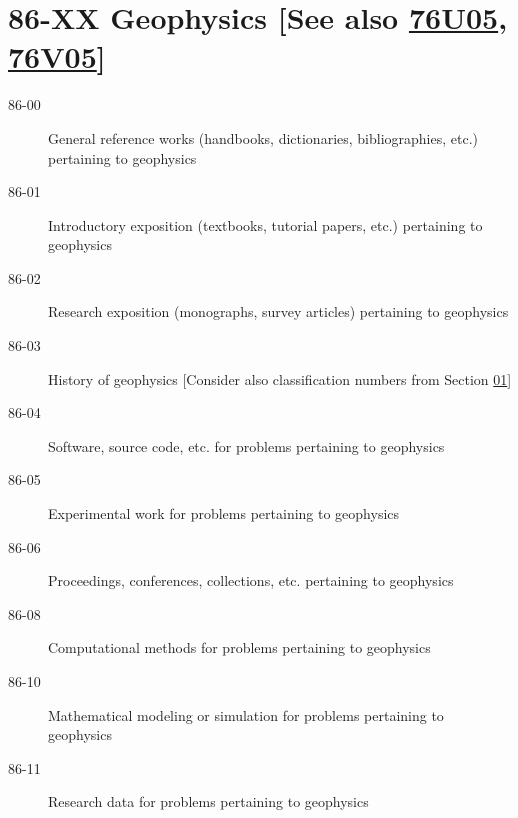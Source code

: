 \section*{86-XX Geophysics [See also \hyperref[76U05]{76U05}, \hyperref[76V05]{76V05}] }\label{86-XX}
\begin{description}
\item [86-00]\label{86-00} General reference works (handbooks, dictionaries, bibliographies, etc.) pertaining to geophysics
\item [86-01]\label{86-01} Introductory exposition (textbooks, tutorial papers, etc.) pertaining to geophysics
\item [86-02]\label{86-02} Research exposition (monographs, survey articles) pertaining to geophysics
\item [86-03]\label{86-03} History of geophysics [Consider also classification numbers from Section \hyperref[01-XX]{01}]
\item [86-04]\label{86-04} Software, source code, etc. for problems pertaining to geophysics
\item [86-05]\label{86-05} Experimental work for problems pertaining to geophysics
\item [86-06]\label{86-06} Proceedings, conferences, collections, etc. pertaining to geophysics
\item [86-08]\label{86-08} Computational methods for problems pertaining to geophysics
\item [86-10]\label{86-10} Mathematical modeling or simulation for problems pertaining to geophysics
\item [86-11]\label{86-11} Research data for problems pertaining to geophysics
\end{description}
